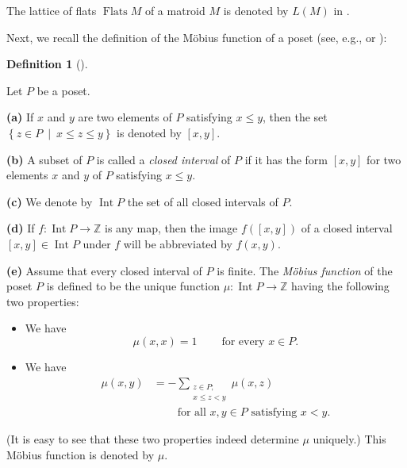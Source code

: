 \documentclass[numbers=enddot,12pt,final,onecolumn,notitlepage]{scrartcl}%
\theoremstyle{definition}
\newtheorem{defi}[theo]{Definition}
\newenvironment{definition}[1][]
{\begin{defi}[#1]\begin{leftbar}}
{\end{leftbar}\end{defi}}
\let\sumnonlimits\sum
\renewcommand{\sum}{\sumnonlimits\limits}
\begin{document}
The lattice of flats $\operatorname*{Flats}M$ of a matroid $M$ is denoted by
$L\left(  M\right)  $ in \cite[\S 3.2]{Stanley}.

Next, we recall the definition of the M\"{o}bius function of a poset (see,
e.g., \cite[Definition 1.2]{Stanley} or \cite[\S 2.2]{Martin22}):

\begin{definition}
\label{def.moebius}Let $P$ be a poset.

\textbf{(a)} If $x$ and $y$ are two elements of $P$ satisfying $x\leq y$, then
the set $\left\{  z\in P\ \mid\ x\leq z\leq y\right\}  $ is denoted by
$\left[  x,y\right]  $.

\textbf{(b)} A subset of $P$ is called a \emph{closed interval} of $P$ if it
has the form $\left[  x,y\right]  $ for two elements $x$ and $y$ of $P$
satisfying $x\leq y$.

\textbf{(c)} We denote by $\operatorname*{Int}P$ the set of all closed
intervals of $P$.

\textbf{(d)} If $f:\operatorname*{Int}P\rightarrow\mathbb{Z}$ is any map, then
the image $f\left(  \left[  x,y\right]  \right)  $ of a closed interval
$\left[  x,y\right]  \in\operatorname*{Int}P$ under $f$ will be abbreviated by
$f\left(  x,y\right)  $.

\textbf{(e)} Assume that every closed interval of $P$ is finite. The
\emph{M\"{o}bius function} of the poset $P$ is defined to be the unique
function $\mu:\operatorname*{Int}P\rightarrow\mathbb{Z}$ having the following
two properties:

\begin{itemize}
\item We have
\begin{equation}
\mu\left(  x,x\right)  =1\ \ \ \ \ \ \ \ \ \ \text{for every }x\in P.
\label{eq.def.moebius.rec1}%
\end{equation}


\item We have%
\begin{align}
\mu\left(  x,y\right)   &  =-\sum_{\substack{z\in P;\\x\leq z<y}}\mu\left(
x,z\right) \label{eq.def.moebius.rec2}\\
&  \ \ \ \ \ \ \ \ \ \ \text{for all }x,y\in P\text{ satisfying }x<y.\nonumber
\end{align}

\end{itemize}

(It is easy to see that these two properties indeed determine $\mu$ uniquely.)
This M\"{o}bius function is denoted by $\mu$.
\end{definition}
\end{document}
